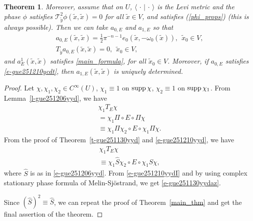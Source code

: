 \documentclass{article}
\newtheorem{theorem}{Theorem}[section]
\newcommand{\mct}{\mathcal T}
\begin{document}
\begin{theorem}
         Moreover, assume that on $U$, $\langle\,\cdot\,|\,\cdot\,\rangle$ is the Levi metric and the phase $\phi$ satisfies $\mct_{\widetilde y}^2\phi(\widetilde x,\widetilde x) = 0$ for all $\widetilde x \in V$, and satisfies (\ref{phi_props}) (this is always possible). Then we can take $a_{0,E}$ and $a_{1,E}$ so that 
         \begin{equation}\label{e-gue251210ycdt}
         \begin{split}
         &a_{0,E}(\widetilde{x},  \widetilde{x})=\frac{1}{2}\pi^{-n-1}e_0(\widetilde x,-\omega_0(\widetilde x)),\ \ \widetilde{x}_0\in V,\\
         &T_{\widetilde y}a_{0,E}(\widetilde x,\widetilde x)=0,\ \ \widetilde{x}_0\in V,
         \end{split}
         \end{equation}
         and $a^1_E(\widetilde x,\widetilde x)$ satisfies \eqref{main_formula}, for all $\widetilde{x}_0\in V$. Moreover, if $a_{0,E}$ satisfies \eqref{e-gue251210ycdt}, then $a_{1,E}(\widetilde x,\widetilde x)$ is uniquely determined.
\end{theorem} 

\begin{proof}
Let $\chi, \chi_1, \chi_2\in C^\infty(U)$, $\chi_1\equiv1$ on ${\rm supp\,}\chi$, 
$\chi_2\equiv1$ on ${\rm supp\,}\chi_1$.
From Lemma~\ref{l-gue251206yyd}, we
have 
\begin{equation}\label{e-gue251210yyd}
\begin{split}
&\chi_1T_E\chi\\
&=\chi_1\Pi\circ E\circ\Pi\chi\\
&\equiv \chi_1\Pi\chi_2\circ E\circ\chi_1\Pi\chi.
\end{split}
\end{equation}
From the proof of Theorem~\ref{t-gue251130yyd} and \eqref{e-gue251210yyd}, we have 
\begin{equation}\label{e-gue251210yydI}
\begin{split}
&\chi_1T_E\chi\\
&\equiv \chi_1\hat S\chi_2\circ E\circ\chi_1\hat S\chi,
\end{split}
\end{equation}
where $\hat S$ is as in \eqref{e-gue251206yyd}. From \eqref{e-gue251210yydI} and by using complex stationary phase formula of Melin-Sj\"ostrand, we get \eqref{e-gue251130yydaz}.

Since $(\hat S)^2\equiv\hat S$, we can repeat the proof of Theorem~\ref{main_thm} and get the final assertion of the theorem.
\end{proof}
\end{document}
